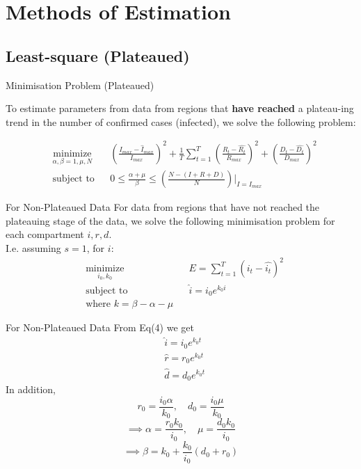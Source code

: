 \documentclass{beamer}
\begin{document}

\section{Methods of Estimation}

\subsection{Least-square (Plateaued)}
\begin{frame}{Minimisation Problem (Plateaued)}

To estimate parameters from data from regions that \textbf{have reached} a plateau-ing trend in the number of confirmed cases (infected), we solve the following problem: 

\begin{equation}
\begin{aligned}
& \underset{\alpha, \beta=1, \mu, N}{\text{minimize}} & &  \left(\frac{I_{max} - \widehat{I}_{max}}{I_{max}}\right)^2 + \frac{1}{T} \sum_{t=1}^{T} \left(\frac{R_t - \widehat{R_t}}{R_{max}}\right)^2 + \left(\frac{D_t - \widehat{D_t}}{D_{max}}\right)^2\\
& \text{subject to}
& & 0 \leq \frac{\alpha + \mu}{\beta} \leq \left(\frac{N-( I + R + D )}{N} \right)\bigg\rvert_{I=I_{max}}
 \end{aligned}
\end{equation}
\end{frame}

\begin{frame}{For Non-Plateaued Data}
For data from regions that have not reached the plateauing stage of the data, we solve the following minimisation problem for each compartment $i, r, d$. \\ 
I.e. assuming $s = 1$, for $i$: \\
\begin{equation}
\begin{aligned}
& \underset{i_0, k_0}{\text{minimize}} & &  E = \sum_{t=1}^{T} (i_t - \widehat{i_t})^2 \\
& \text{subject to}
& & \hat{i} = i_0 e^{k_0 i} \\
& \text{where } k = \beta -\alpha - \mu &
 \end{aligned}
\end{equation}
\end{frame}


\begin{frame}{For Non-Plateaued Data}
From Eq(4) we get
\begin{equation}
\begin{aligned}
& \hat{i} = i_0 e^{k_0 t} \\
& \hat{r} = r_0 e^{k_0 t} \\
& \hat{d} = d_0 e^{k_0 t} 
 \end{aligned}
\end{equation}
In addition, $$r_0 = \frac{i_0 \alpha}{k_0}, \quad d_0 = \frac{i_0 \mu}{k_0} $$
$$\implies \alpha = \frac{r_0 k_0}{ i_0}, \quad \mu = \frac{d_0 k_0}{ i_0} $$
$$\implies \beta = k_0 + \frac{k_0}{i_0} (d_0 + r_0)$$

\end{frame}
\end{document}
